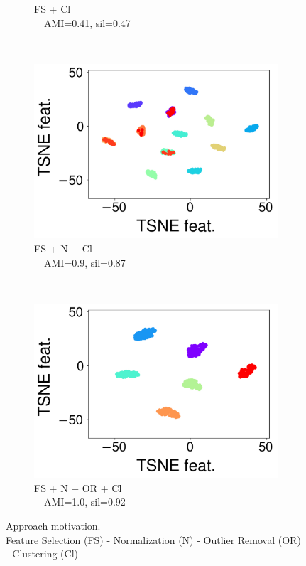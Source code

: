 \begin{figure}[t]
\begin{subfigure}[t]{0.23\columnwidth}
        \caption{FS + Cl\\$\quad$AMI=0.41, sil=0.47}
        \label{clustering-fig:ca4}
    \end{subfigure}
    ~
    \begin{subfigure}[t]{0.2\columnwidth}
        \centering
        \includegraphics[scale=.15]{chapters/data-centric/unsupervised/img/ft_sc_cl.pdf}
        \caption{FS + N + Cl\\$\quad$AMI=0.9, sil=0.87}
        \label{clustering-fig:ca5}
    \end{subfigure}
    ~
    \begin{subfigure}[t]{0.28\columnwidth}
        \centering
        \includegraphics[scale=.15]{chapters/data-centric/unsupervised/img/ft_sc_ou_cl.pdf}
        \caption{FS + N + OR + Cl\\$\quad$AMI=1.0, sil=0.92}
        \label{clustering-fig:ca6}
    \end{subfigure}
    \caption{Approach motivation. \\
    \small{Feature Selection (FS) - Normalization (N) - Outlier Removal (OR) - Clustering (Cl)}}
    \label{clustering-fig:clusterings}
\end{figure}


